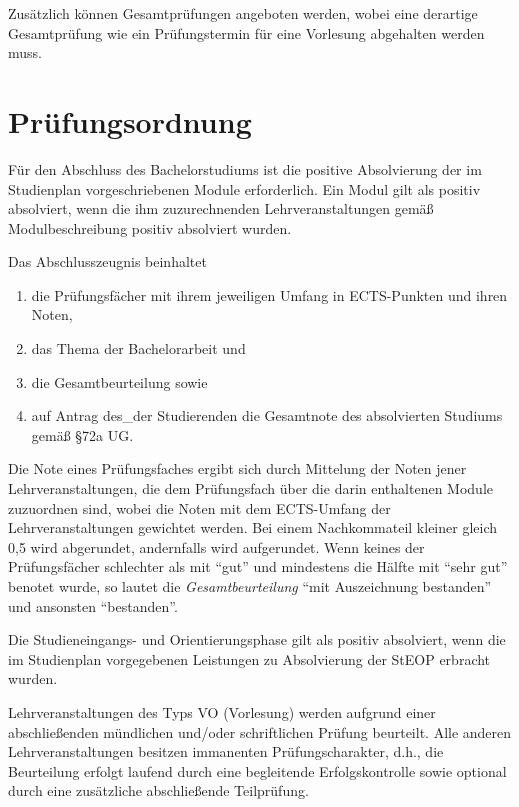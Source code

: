 Zusätzlich können Gesamtprüfungen angeboten werden, wobei eine
derartige Gesamtprüfung wie ein Prüfungstermin für eine Vorlesung
abgehalten werden muss.


\section{Prüfungsordnung}\label{sec:PO}

Für den Abschluss des Bachelorstudiums ist die positive Absolvierung
der im Studienplan vorgeschriebenen Module erforderlich. Ein Modul
gilt als positiv absolviert, wenn die ihm zuzurechnenden
Lehrveranstaltungen gemäß Modulbeschreibung positiv absolviert wurden.
%

Das Abschlusszeugnis beinhaltet
\begin{enumerate}[label=(\alph*)]
\item die Prüfungsfächer mit ihrem jeweiligen Umfang in ECTS-Punkten
  und ihren Noten,
%
\item das Thema der Bachelorarbeit und
\item die Gesamtbeurteilung sowie
\item auf Antrag des\_der Studierenden die Gesamtnote des absolvierten
Studiums gemäß §72a UG.
\end{enumerate}

Die Note eines Prüfungsfaches ergibt sich durch Mittelung der Noten
jener Lehrveranstaltungen, die dem Prüfungsfach über die darin
enthaltenen Module zuzuordnen sind, wobei die Noten mit dem
ECTS-Umfang der Lehrveranstaltungen gewichtet werden. Bei einem
Nachkommateil kleiner gleich 0,5 wird abgerundet, andernfalls
wird aufgerundet. Wenn keines der Prüfungsfächer schlechter als mit
"`gut"' und mindestens die Hälfte mit "`sehr gut"' benotet wurde, so
lautet die \emph{Gesamtbeurteilung} "`mit Auszeichnung bestanden"'
und ansonsten "`bestanden"'.

Die Studieneingangs- und Orientierungsphase gilt als positiv
absolviert, wenn die im Studienplan vorgegebenen Leistungen zu
Absolvierung der StEOP erbracht wurden.

Lehrveranstaltungen des Typs VO (Vorlesung) werden aufgrund einer
abschließenden mündlichen und/oder schriftlichen Prüfung
beurteilt. Alle anderen Lehrveranstaltungen besitzen immanenten
Prüfungscharakter, d.h., die Beurteilung erfolgt laufend durch eine
begleitende Erfolgskontrolle sowie optional durch eine zusätzliche
abschließende Teilprüfung.

